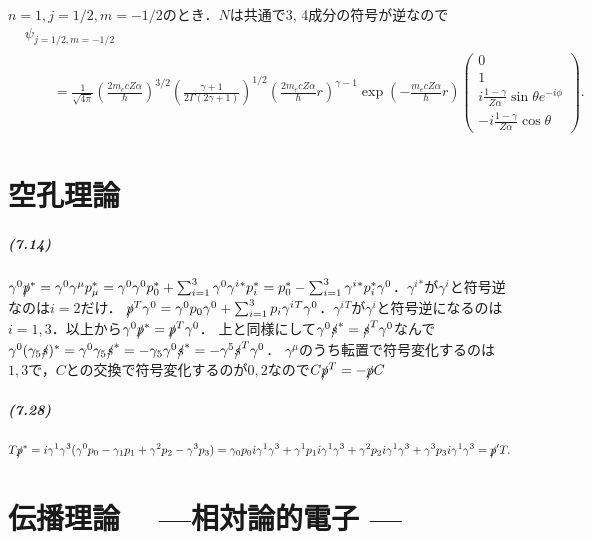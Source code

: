 $n=1,j=1/2,m= - 1/2$のとき．$N$は共通で3, 4成分の符号が逆なので
\begin{align*}
  & \psi_{j=1/2,m= - 1/2} \\
  & \qquad = \frac{1}{\sqrt{4\pi}}\left(\frac{2m_ecZ\alpha}{\hbar}\right)^{3/2}\left(\frac{\gamma + 1}{2\Gamma(2\gamma + 1)}\right)^{1/2}\left(\frac{2m_ecZ\alpha}{\hbar}r\right)^{\gamma - 1}\exp\left( - \frac{m_ecZ\alpha}{\hbar}r\right)
  \begin{pmatrix}
    0\\
    1\\
    i\frac{1 - \gamma}{Z\alpha}\sin\theta e^{ - i\phi}\\
     - i\frac{1 - \gamma}{Z\alpha}\cos\theta
  \end{pmatrix}
  .
\end{align*}

\chapter{空孔理論}
\paragraph{(7.14)}
$\gamma^0\slashed{p} ^*=\gamma^0\gamma^\mu p_\mu^*=\gamma^0\gamma^0p_0^* + \sum_{i=1}^3\gamma^0\gamma^{i}{}^*p_i^*=p_0^* - \sum_{i=1}^3 \gamma^{i}{}^*p_i^*\gamma^0$．$\gamma^i{}^*$が$\gamma^i$と符号逆なのは$i=2$だけ．
$\slashed{p} ^T\gamma^0=\gamma^0p_0\gamma^0 + \sum_{i=1}^3p_i\gamma^i{}^T\gamma^0$．$\gamma^i{}^T$が$\gamma^i$と符号逆になるのは$i=1,3$．以上から$\gamma^0\slashed{p} ^*=\slashed{p} ^T\gamma^0$．
上と同様にして$\gamma^0\slashed{s}^*=\slashed{s}^T\gamma^0$なんで$\gamma^0(\gamma_5\slashed{s})^*=\gamma^0\gamma_5\slashed{s}^*= - \gamma_5\gamma^0\slashed{s}^*= - \gamma^5\slashed{s}^T\gamma^0$．
$\gamma^\mu$のうち転置で符号変化するのは$1,3$で，$C$との交換で符号変化するのが$0,2$なので$C\slashed{p} ^T= - \slashed{p} C$

\paragraph{(7.28)}
\[T\slashed{p} ^*=i\gamma^1\gamma^3(\gamma^0p_0 - \gamma_1p_1 + \gamma^2p_2 - \gamma^3p_3)=\gamma_0p_0i\gamma^1\gamma^3 + \gamma^1p_1i\gamma^1\gamma^3 + \gamma^2p_2i\gamma^1\gamma^3 + \gamma^3p_3i\gamma^1\gamma^3=\slashed{p} 'T.\]


\setcounter{chapter}{8}
\chapter{伝播理論　 ---相対論的電子 ---}
